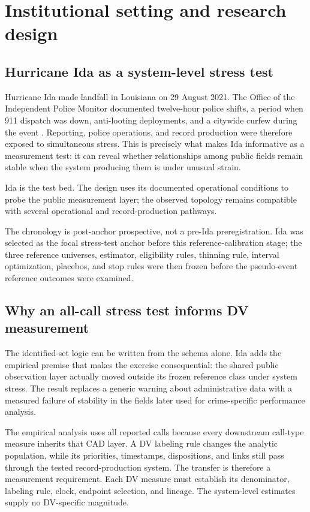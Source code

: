 \documentclass[11pt]{article}
\begin{document}
\section{Institutional setting and research design}

\subsection{Hurricane Ida as a system-level stress test}

Hurricane Ida made landfall in Louisiana on 29 August 2021. The Office of the Independent Police Monitor documented twelve-hour police shifts, a period when 911 dispatch was down, anti-looting deployments, and a citywide curfew during the event \citep{OIPM2021}. Reporting, police operations, and record production were therefore exposed to simultaneous stress. This is precisely what makes Ida informative as a measurement test: it can reveal whether relationships among public fields remain stable when the system producing them is under unusual strain.

Ida is the test bed. The design uses its documented operational conditions to probe the public measurement layer; the observed topology remains compatible with several operational and record-production pathways.

The chronology is post-anchor prospective, not a pre-Ida preregistration. Ida was selected as the focal stress-test anchor before this reference-calibration stage; the three reference universes, estimator, eligibility rules, thinning rule, interval optimization, placebos, and stop rules were then frozen before the pseudo-event reference outcomes were examined.

\subsection{Why an all-call stress test informs DV measurement}

The identified-set logic can be written from the schema alone. Ida adds the empirical premise that makes the exercise consequential: the shared public observation layer actually moved outside its frozen reference class under system stress. The result replaces a generic warning about administrative data with a measured failure of stability in the fields later used for crime-specific performance analysis.

The empirical analysis uses all reported calls because every downstream call-type measure inherits that CAD layer. A DV labeling rule changes the analytic population, while its priorities, timestamps, dispositions, and links still pass through the tested record-production system. The transfer is therefore a measurement requirement. Each DV measure must establish its denominator, labeling rule, clock, endpoint selection, and lineage. The system-level estimates supply no DV-specific magnitude.
\end{document}
